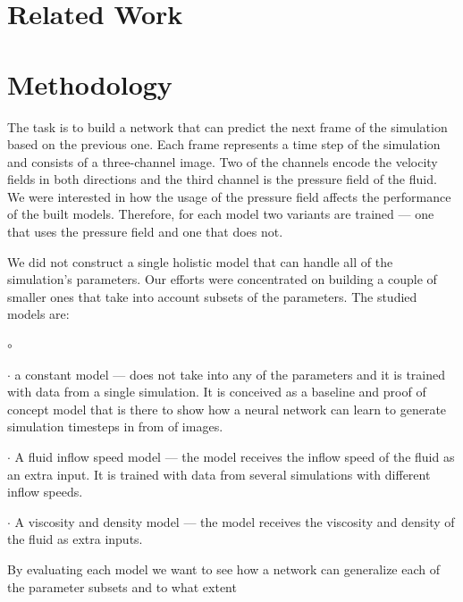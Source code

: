 \documentclass{llncs}
\begin{document}
\section{Related Work}\label{related_work}

\section{Methodology}\label{methodology}
The task is to build a network that can predict the next frame of the simulation based on the previous one. Each frame represents a time step of the simulation and consists of a three-channel image. Two of the channels encode the velocity fields in both directions and the third channel is the pressure field of the fluid. We were interested in how the usage of the pressure field affects the performance of the built models. Therefore, for each model two variants are trained --- one that uses the pressure field and one that does not.

We did not construct a single holistic model that can handle all of the simulation's parameters. Our efforts were concentrated on building a couple of smaller ones that take into account subsets of the parameters. The studied models are:
\begin{list}{$\circ$}{}
\item[$\cdot$] a constant model --- does not take into any of the parameters and it is trained with data from a single simulation. It is conceived as a baseline and proof of concept model that is there to show how a neural network can learn to generate simulation timesteps in from of images.
\item[$\cdot$] A fluid inflow speed model --- the model receives the inflow speed of the fluid as an extra input. It is trained with data from several simulations with different inflow speeds.
\item[$\cdot$] A viscosity and density model --- the model receives the viscosity and density of the fluid as extra inputs.
\end{list}
By evaluating each model we want to see how a network can generalize each of the parameter subsets and to what extent
\end{document}
